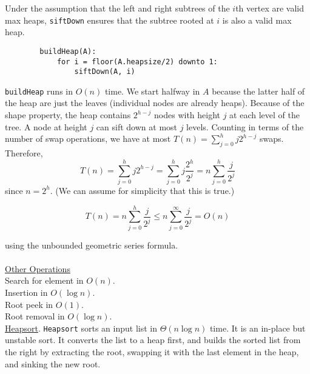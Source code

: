 \documentclass[12pt, fleqn]{general}
\begin{document}
\begin{multicols*}{2}
    Under the assumption that the left and right subtrees of the $i$th vertex are valid max heaps, \texttt{siftDown} ensures that the subtree rooted at $i$ is also a valid max heap.

    \begin{framed}
    \begingroup
    \makeatletter
    \@totalleftmargin=-1.5cm
    \begin{verbatim}
        buildHeap(A):
            for i = floor(A.heapsize/2) downto 1:
                siftDown(A, i)
    \end{verbatim}
    \makeatother
    \endgroup
    \end{framed}

    \texttt{buildHeap} runs in $O(n)$ time. We start halfway in $A$ because the latter half of the heap are just the leaves (individual nodes are already heaps). Because of the shape property, the heap contains $2^{h-j}$ nodes with height $j$ at each level of the tree. A node at height $j$ can sift down at most $j$ levels. Counting in terms of the number of swap operations, we have at most $T(n) = \sum_{j=0}^h j 2^{h-j}$ swaps.\\

    Therefore, $$T(n) = \sum_{j=0}^h j2^{h-j} = \sum_{j=0}^h j\frac{2^h}{2^j} = n \sum_{j=0}^h \frac{j}{2^j}$$ since $n = 2^h$. (We can assume for simplicity that this is true.)

    $$T(n) = n\sum_{j=0}^h \frac{j}{2^j} \leq n\sum_{j=0}^\infty \frac{j}{2^j} = O(n)$$

    using the unbounded geometric series formula.\\\\

    \underline{Other Operations}\\

    Search for element in $O(n)$.\\

    Insertion in $O(\log n)$.\\

    Root peek in $O(1)$.\\

    Root removal in $O(\log n)$.\\

    \underline{Heapsort}. \texttt{Heapsort} sorts an input list in $\Theta(n\log n)$ time. It is an in-place but unstable sort. It converts the list to a heap first, and builds the sorted list from the right by extracting the root, swapping it with the last element in the heap, and sinking the new root.


\end{multicols*}
\end{document}
